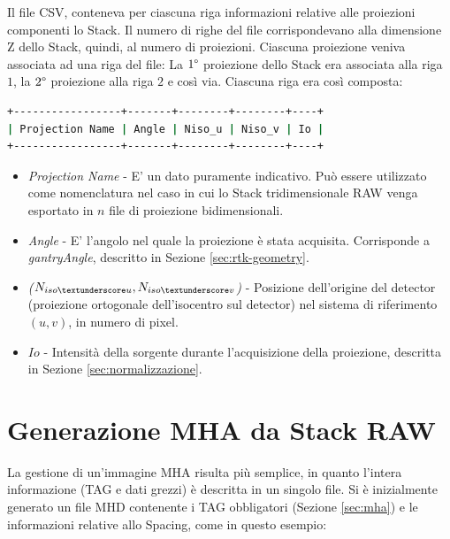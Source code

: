 \documentclass[a4paper,12pt, doubleside]{report}
\begin{document}
            \bigskip    
            \par
                Il file CSV, conteneva per ciascuna riga informazioni relative alle proiezioni componenti lo Stack. Il numero di righe del file corrispondevano alla dimensione Z dello Stack, quindi, al numero di proiezioni. Ciascuna proiezione veniva associata ad una riga del file: La $1\degree$ proiezione dello Stack era associata alla riga $1$, la $2\degree$ proiezione alla riga $2$ e così via. Ciascuna riga era così composta: 
                    
                \begin{lstlisting}[language=bash, frame=bt] 
+-----------------+-------+--------+--------+----+
| Projection Name | Angle | Niso_u | Niso_v | Io |
+-----------------+-------+--------+--------+----+
                \end{lstlisting}
                    
                \begin{itemize}
                    \item \textit{Projection Name} - E' un dato puramente indicativo. Può essere utilizzato come nomenclatura nel caso in cui lo Stack tridimensionale RAW venga esportato in $n$ file di proiezione bidimensionali.
                        
                    \item \textit{Angle} - E' l'angolo nel quale la proiezione è stata acquisita. Corrisponde a \textit{gantryAngle}, descritto in Sezione \ref{sec:rtk-geometry}.
                        
                    \item \textit{($N_{iso\textunderscore u},N_{iso\textunderscore v}$)} - Posizione dell'origine del detector (proiezione ortogonale dell'isocentro sul detector) nel sistema di riferimento $(u,v)$, in numero di pixel.
                        
                    \item \textit{$Io$} - Intensità della sorgente durante l'acquisizione della proiezione, descritta in Sezione \ref{sec:normalizzazione}.
                \end{itemize}
                
            
        \section{Generazione MHA da Stack RAW}
            \label{sec:conversione}
            \par
                La gestione di un'immagine MHA risulta più semplice, in quanto l'intera informazione (TAG e dati grezzi) è descritta in un singolo file. Si è inizialmente generato un file MHD contenente i TAG obbligatori (Sezione \ref{sec:mha}) e le informazioni relative allo Spacing, come in questo esempio:
                    
\end{document}
